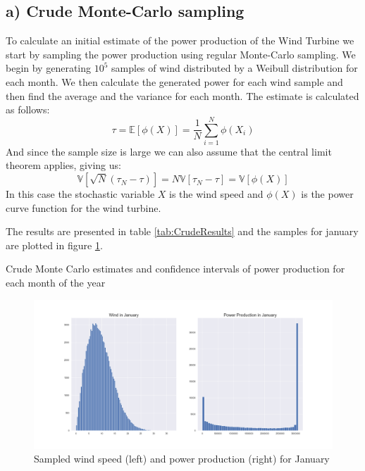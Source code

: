 \documentclass[a4paper]{article}
\begin{document}
\subsection*{a) Crude Monte-Carlo sampling}
To calculate an initial estimate of the power production of the Wind Turbine we start by sampling the power production using regular Monte-Carlo sampling. We begin by generating $10^5$ samples of wind distributed by a Weibull distribution for each month. We then calculate the generated power for each wind sample and then find the average and the variance for each month. The estimate is calculated as follows:
\begin{equation}
    \tau = \mathbb{E}[\phi(X)] = \frac{1}{N}\sum_{i = 1}^N\phi(X_i)
\end{equation}
And since the sample size is large we can also assume that the central limit theorem applies, giving us:
\begin{equation}
    \mathbb{V}[\sqrt{N}(\tau_N-\tau)] = N\mathbb{V}[\tau_N-\tau] = \mathbb{V}[\phi(X)]
\end{equation}
In this case the stochastic variable $X$ is the wind speed and $\phi(X)$ is the power curve function for the wind turbine.

The results are presented in table \ref{tab:CrudeResults} and the samples for january are plotted in figure \ref{fig:samplesJan}.
\begin{table}[H]
    \centering
    \caption{Crude Monte Carlo estimates and confidence intervals of power production for each month of the year}
    \label{tab:CrudeResults}
    
\end{table}

\begin{figure}[H]
    \centering
    \includegraphics[width = 1.0\textwidth]{images/janCrudeMC}
    \caption{Sampled wind speed (left) and power production (right) for January}
    \label{fig:samplesJan}
\end{figure}
\end{document}
